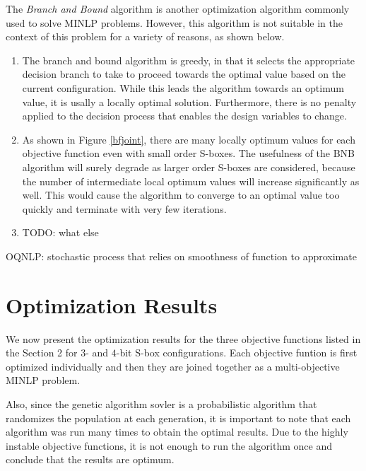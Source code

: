 \documentclass[11pt]{article}
\begin{document}
The \emph{Branch and Bound} algorithm is another optimization algorithm commonly used to solve MINLP problems. However, this algorithm is not suitable in the context of this problem for a variety of reasons, as shown below.

\begin{enumerate}
	\item The branch and bound algorithm is greedy, in that it selects the appropriate decision branch to take to proceed towards the optimal value based on the current configuration. While this leads the algorithm towards an optimum value, it is usally a locally optimal solution. Furthermore, there is no penalty applied to the decision process that enables the design variables to change. 
	\item As shown in Figure \ref{bfjoint}, there are many locally optimum values for each objective function even with small order S-boxes. The usefulness of the BNB algorithm will surely degrade as larger order S-boxes are considered, because the number of intermediate local optimum values will increase significantly as well. This would cause the algorithm to converge to an optimal value too quickly and terminate with very few iterations. 
	\item TODO: what else
\end{enumerate}

OQNLP: stochastic process that relies on smoothness of function to approximate

\section{Optimization Results}

We now present the optimization results for the three objective functions listed in the Section 2 for $3$- and $4$-bit S-box configurations. Each objective funtion is first optimized individually and then they are joined together as a multi-objective MINLP problem. 

Also, since the genetic algorithm sovler is a probabilistic algorithm that randomizes the population at each generation, it is important to note that each algorithm was run many times to obtain the optimal results. Due to the highly instable objective functions, it is not enough to run the algorithm once and conclude that the results are optimum. 
\end{document}
